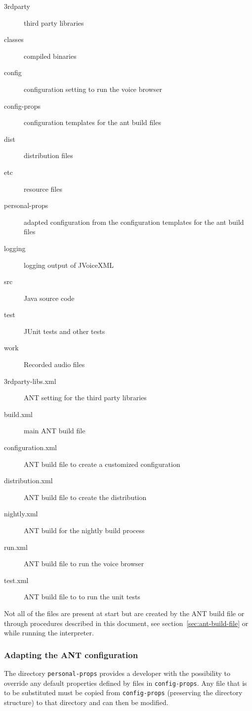 \documentclass[11pt,a4paper]{article}
\begin{document}
\begin{description}
\item[3rdparty] third party libraries
\item[classes] compiled binaries
\item[config] configuration setting to run the voice browser
\item[config-props] configuration templates for the ant build files
\item[dist] distribution files
\item[etc] resource files
\item[personal-props] adapted configuration from the configuration templates
for the ant build files
\item[logging] logging output of JVoiceXML
\item[src] Java source code
\item[test] JUnit tests and other tests
\item[work] Recorded audio files
\item[3rdparty-libs.xml] ANT setting for the third party libraries
\item[build.xml] main ANT build file
\item[configuration.xml] ANT build file to create a customized configuration
\item[distribution.xml] ANT build file to create the distribution
\item[nightly.xml] ANT build for the nightly build process
\item[run.xml] ANT build file to run the voice browser
\item[test.xml] ANT build file to to run the unit tests
\end{description}

Not all of the files are present at start but are created by the
ANT build file or through procedures described in this 
document, see section~\ref{sec:ant-build-file} or while running the interpreter.

\subsubsection{Adapting the ANT configuration}

The directory \texttt{personal-props} provides a developer with the 
possibility to override any 
default properties defined by files in \texttt{config-props}. 
Any file that is to be
substituted must be copied from \texttt{config-props} 
(preserving the directory structure) to that directory and can then be 
modified.
\end{document}

